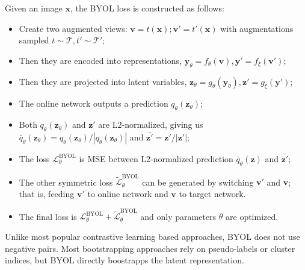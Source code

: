 \documentclass[12pt]{article}
\begin{document}
Given an image $\mathbf{x}$, the BYOL loss is constructed as follows:
\begin{itemize}
    \item Create two augmented views: $\mathbf{v}=t(\mathbf{x}); \mathbf{v}'=t'(\mathbf{x})$ with augmentations sampled $t \sim \mathcal{T}, t' \sim \mathcal{T}'$;
    \item Then they are encoded into representations, $\mathbf{y}_\theta=f_\theta(\mathbf{v}), \mathbf{y}'=f_\xi(\mathbf{v}')$;
    \item Then they are projected into latent variables, $\mathbf{z}_\theta=g_\theta(\mathbf{y}_\theta), \mathbf{z}'=g_\xi(\mathbf{y}')$;
    \item The online network outputs a prediction $q_\theta(\mathbf{z}_\theta)$;
    \item Both $q_\theta(\mathbf{z}_\theta)$ and $\mathbf{z}'$ are L2-normalized, giving us $\bar{q}_\theta(\mathbf{z}_\theta) = q_\theta(\mathbf{z}_\theta) / | q_\theta(\mathbf{z}_\theta) |$ and $\bar{\mathbf{z}'} = \mathbf{z}' / |\mathbf{z}'|$;
    \item The loss $\mathcal{L}^\text{BYOL}_\theta$ is MSE between L2-normalized prediction $\bar{q}_\theta(\mathbf{z})$ and $\bar{\mathbf{z}'}$;
    \item The other symmetric loss $\tilde{\mathcal{L}}^\text{BYOL}_\theta$ can be generated by switching $\mathbf{v}'$ and $\mathbf{v}$; that is, feeding $\mathbf{v}'$ to online network and $\mathbf{v}$ to target network.
    \item The final loss is $\mathcal{L}^\text{BYOL}_\theta + \tilde{\mathcal{L}}^\text{BYOL}_\theta$ and only  parameters $\theta$ are optimized.
\end{itemize}

Unlike most popular contrastive learning based approaches, BYOL does not use negative pairs. Most bootstrapping approaches rely on pseudo-labels or cluster indices, but BYOL directly boostrapps the latent representation.
\end{document}
